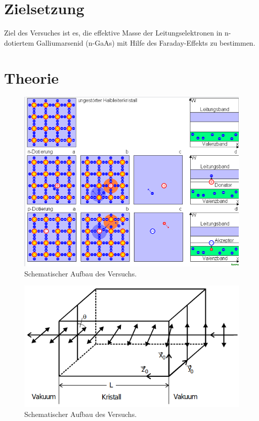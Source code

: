 \section{Zielsetzung}
\label{sec:Zielsetzung}

Ziel des Versuches ist es, die effektive Masse der Leitungselektronen in n-dotiertem Galliumarsenid (n-GaAs)
mit Hilfe des Faraday-Effekts zu bestimmen.

\section{Theorie}
\label{sec:Theorie}

\begin{figure}[H]
    \centering
    \includegraphics[scale=0.35]{Abbildungen/Dotierung.png}
    \caption{Schematischer Aufbau des Versuchs.\cite{Dotierung}}
    \label{fig:aufbau}
\end{figure}


\begin{figure}[H]
    \centering
    \includegraphics[scale=0.35]{Abbildungen/Doppelbrechung.png}
    \caption{Schematischer Aufbau des Versuchs.\cite{V46_Anhang}}
    \label{fig:aufbau}
\end{figure}